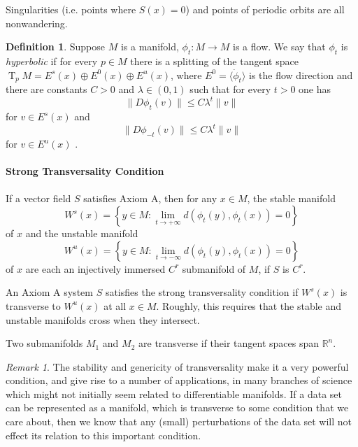 \documentclass{article}
\theoremstyle{definition} \newtheorem{definition}{Definition}
\theoremstyle{remark} \newtheorem{remark}{Remark}
\newcommand{\T}{\operatorname{T}}
\newcommand{\TpM}{\T_p\!M}
\newcounter{ct}
\begin{document}
Singularities (i.e. points where $S(x)=0$) and points of periodic orbits are all nonwandering.

\begin{definition}
 Suppose $M$ is a manifold, $\phi_t\colon M\rightarrow M$ is a flow.
  We say that $\phi_t$ is \emph{hyperbolic} %
   if for every $p\in M$ there is a splitting of the tangent space $\TpM=E^s(x)\oplus E^0(x)\oplus E^u(x)$, where $E^0=\langle \dot\phi_t\rangle$ is the flow direction and there are constants $C>0$ and $\lambda\in(0,1)$ such that for every $t>0$ one has \[\|D\phi_t(v)\|\leq C\lambda^t\|v\|\]
for $v\in E^s(x)$ and \[\|D\phi_{-t}(v)\|\leq C\lambda^t\|v\|\] for $v\in E^u(x)$ . 
\end{definition}

\paragraph{Strong Transversality Condition}

If a vector field $S$ satisfies Axiom A, then for any $x \in M$, the stable manifold 
\[W^s(x)=\left\{ y \in M \colon \lim_{t\rightarrow+\infty} d(\phi_t( y), \phi_t(x))=0\right\}\]
of $x$ and the unstable manifold
\[W^u(x)=\left\{ y \in M \colon \lim_{t\rightarrow-\infty} d(\phi_t( y), \phi_t(x))=0\right\}\]
of $x$ are each an injectively immersed $C^r$ submanifold of $M$, if $S$ is $C^r$.

An Axiom A system $S$ satisfies the strong transversality condition if $W^s(x)$ is transverse to $W^u(x)$ at all $x\in M$.
Roughly, this requires that the stable and unstable manifolds cross when they intersect. 

Two submanifolds $M_1$ and $M_2$ are transverse if their tangent spaces span $\mathbb{R}^n$.

\begin{remark}
The stability and genericity of transversality make it a very powerful condition, and give rise to a number of applications, in many branches of science which might not initially seem related to
differentiable manifolds. If a data set can be represented as a manifold, which is transverse to some condition that we care about, then we know that any (small) perturbations of the data set will not effect its relation to this important condition.
\end{remark}
\end{document}
